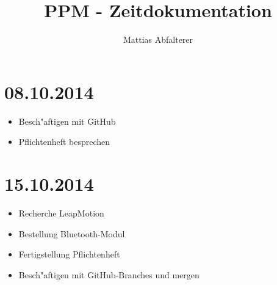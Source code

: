 \documentclass[11pt,a4paper]{article}
\begin{document}
\title{PPM - Zeitdokumentation}
\author{Mattias Abfalterer}
\maketitle

\vfill
\pagebreak

\chapter{08.10.2014}

\begin{itemize}
\item Besch"aftigen mit GitHub
\item Pflichtenheft besprechen
\end{itemize}



\chapter{15.10.2014}

\begin{itemize}
\item Recherche LeapMotion
\item Bestellung Bluetooth-Modul
\item Fertigstellung Pflichtenheft
\item Besch"aftigen mit GitHub-Branches und mergen
\end{itemize}
\end{document}
